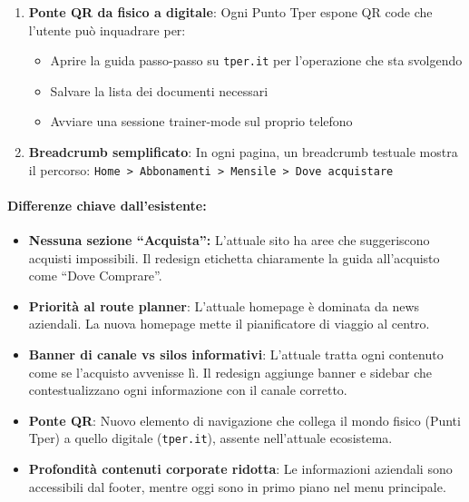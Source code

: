 \begin{tcolorbox}[colback=backgroundColor,colframe=borderColor,arc=2mm]
{\begin{enumerate}[leftmargin=*]
 \item \textbf{Ponte QR da fisico a digitale}: Ogni Punto Tper espone QR code che l'utente può inquadrare per:
 \begin{itemize}
   \item Aprire la guida passo-passo su \texttt{tper.it} per l'operazione che sta svolgendo
   \item Salvare la lista dei documenti necessari
   \item Avviare una sessione trainer-mode sul proprio telefono
 \end{itemize}

 \item \textbf{Breadcrumb semplificato}: In ogni pagina, un breadcrumb testuale mostra il percorso: \texttt{Home > Abbonamenti > Mensile > Dove acquistare}

\end{enumerate}

\paragraph{Differenze chiave dall'esistente:}

\begin{itemize}
 \item \textbf{Nessuna sezione ``Acquista'':} L'attuale sito ha aree che suggeriscono acquisti impossibili. Il redesign etichetta chiaramente la guida all'acquisto come ``Dove Comprare''.
 \item \textbf{Priorità al route planner}: L'attuale homepage è dominata da news aziendali. La nuova homepage mette il pianificatore di viaggio al centro.
 \item \textbf{Banner di canale vs silos informativi}: L'attuale tratta ogni contenuto come se l'acquisto avvenisse lì. Il redesign aggiunge banner e sidebar che contestualizzano ogni informazione con il canale corretto.
 \item \textbf{Ponte QR}: Nuovo elemento di navigazione che collega il mondo fisico (Punti Tper) a quello digitale (\texttt{tper.it}), assente nell'attuale ecosistema.
 \item \textbf{Profondità contenuti corporate ridotta}: Le informazioni aziendali sono accessibili dal footer, mentre oggi sono in primo piano nel menu principale.
\end{itemize}
}
\end{tcolorbox}

\vspace{0.5cm}

